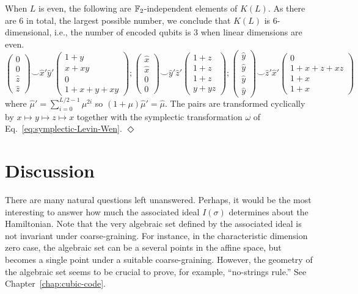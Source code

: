\begin{example}
When $L$ is even, the following are $\mathbb{F}_2$-independent elements of $K(L)$.
As there are 6 in total, the largest possible number, we conclude that $K(L)$ is 6-dimensional,
i.e., the number of encoded qubits is 3 when linear dimensions are even.
\[
 \begin{pmatrix}  0 \\ 0 \\ \widehat z \\ \widehat z \end{pmatrix}
\smile
 \widehat x ' \widehat y '
 \begin{pmatrix}  1+y \\ x+xy \\ 0 \\ 1+x+y+xy \end{pmatrix}
%
 ;
%
 \begin{pmatrix}  \widehat x \\ \widehat x \\ 0 \\ 0 \end{pmatrix}
\smile
 \widehat y ' \widehat z '
 \begin{pmatrix}  1+z \\ 1+z \\ 1+z \\ y+yz \end{pmatrix}
%
  ;
%
 \begin{pmatrix}  \widehat y \\ \widehat y \\ \widehat y \\ \widehat y \end{pmatrix}
\smile 
 \widehat z ' \widehat x '
 \begin{pmatrix}  0 \\ 1+x+z+xz \\ 1+x \\ 1+x \end{pmatrix}
\]
where $\widehat \mu ' = \sum_{i=0}^{L/2-1} \mu^{2i}$ so $(1+\mu)\widehat \mu ' = \widehat \mu$.
The pairs are transformed cyclically by $x \mapsto y \mapsto z \mapsto x$
together with the symplectic transformation $\omega$ of Eq.~\eqref{eq:symplectic-Levin-Wen}.
%
\hfill $\Diamond$
\end{example}


\section{Discussion}
\label{sec:lowD-discussion}

There are many natural questions left unanswered.
Perhaps, it would be the most interesting to answer how much 
the associated ideal $I(\sigma)$
determines about the Hamiltonian.
Note that the very algebraic set defined by the associated ideal
is not invariant under coarse-graining.
For instance, in the characteristic dimension zero case,
the algebraic set can be a several points in the affine space,
but becomes a single point under a suitable coarse-graining.
However, the geometry of the algebraic set seems to be crucial
to prove, for example, ``no-strings rule.''
See Chapter~\ref{chap:cubic-code}.


